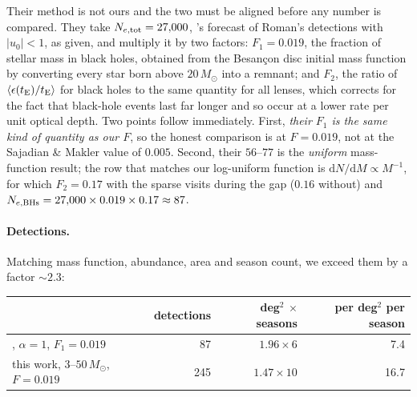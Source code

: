 \documentclass[english,10pt,a4paper]{article}
\newcommand{\tE}{t_{\rm E}}
\newcommand{\Msun}{M_\odot}
\begin{document}
Their method is not ours and the two must be aligned before any number is compared. They take
$N_{e,\rm tot}=27{,}000$, \citet{Penny2019}'s forecast of Roman's detections with $|u_0|<1$, as
given, and
multiply it by two factors: $F_1 = 0.019$, the fraction of stellar mass in black holes, obtained
from the Besan\c{c}on disc initial mass function by converting every star born above $20\,\Msun$
into a remnant; and $F_2$, the ratio of $\langle\epsilon(\tE)/\tE\rangle$ for black holes to the
same quantity for all lenses, which corrects for the fact that black-hole events last far longer
and so occur at a lower rate per unit optical depth. Two points follow immediately. First,
\emph{their $F_1$ is the same kind of quantity as our $F$}, so the honest comparison is at
$F = 0.019$, not at the Sajadian \& Makler value of $0.005$. Second, their $56$--$77$ is the
\emph{uniform} mass-function result; the row that matches our log-uniform function is
$\mathrm{d}N/\mathrm{d}M \propto M^{-1}$, for which $F_2 = 0.17$ with the sparse visits during the gap
($0.16$ without) and $N_{e,\rm BHs} = 27{,}000\times0.019\times0.17 \approx 87$.

\paragraph{Detections.} Matching mass function, abundance, area and season count, we exceed them
by a factor $\sim\!2.3$:

\begin{center}
\begin{tabular}{lrrr}
\toprule
 & detections & deg$^2$ $\times$ seasons & per deg$^2$ per season \\
\midrule
\citet{SajadianSahu2023}, $\alpha=1$, $F_1=0.019$ & 87  & $1.96\times6$  & 7.4 \\
this work, $3$--$50\,\Msun$, $F=0.019$           & 245 & $1.47\times10$ & 16.7 \\
\bottomrule
\end{tabular}
\end{center}
\end{document}
